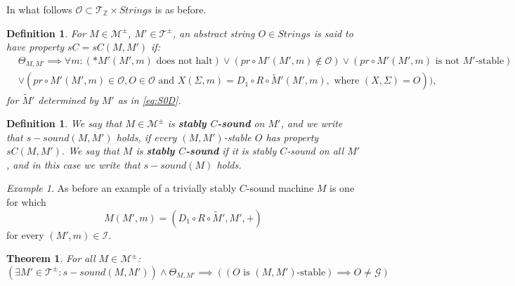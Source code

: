 \documentclass{amsart}  %
\numberwithin{equation}{section}
\newtheorem{theorem}[equation]{Theorem}
\newtheorem{definition}[equation]{Definition}
\theoremstyle{definition}
\theoremstyle{remark}
\newtheorem{example}{Example}
\begin{document}
{In what follows $\mathcal{O} \subset \mathcal{T} _{\mathbb{Z}} \times Strings $ is as before.
\begin{definition} \label{def:SpropertyO} 
For ${M} \in \mathcal{M} ^{\pm} $, ${M}' \in \mathcal{T} ^{\pm}  $,  an abstract string $O \in Strings$  is said to have property \textbf{\emph{ $sC=sC ({M}, {M}')$}} if:
\begin{align*}
   & \Theta _{M,M'} \implies \forall m: (*M'(M',m) \text{ does not halt} )  \lor (pr \circ M' (M',m) \notin \mathcal{O}) \lor (pr \circ M' (M',m) \text{ is not $M'$-stable}) \\  & \lor (pr \circ M' (M',m) \in \mathcal{O}, O \in \mathcal{O} \text{ and } X(\Sigma,m) = D_1 \circ R \circ  \widetilde{M}' (M', m), \text{ where $(X, \Sigma)=O$})),
\end{align*}
for $\widetilde{M}'  $ determined by $M'$ as in \eqref{eq:S0D}. 
\end {definition}
\begin{definition} \label{def:SPsound}
   We say that ${M} \in \mathcal{M} ^{\pm}  $ is \textbf{\emph{stably $C$-sound}} on ${M}'$, and we write that $s-sound ({M}, {M}')$ holds, if every  $(M,M')$-stable $O$ has property $sC ({M}, {M}')$. We say that ${M}$ is \textbf{\emph{stably $C$-sound}} if it is stably $C$-sound on all ${M}'$, and in this case we write that $s-sound ({M})$ holds.
 \end{definition}
\begin{example} \label{example:strivial}
  As before an example of a trivially stably $C$-sound machine $M$ is one for which $$M (M',m) =  (D_1 \circ R \circ  \widetilde{M}', M',+) $$ for every $(M',m) \in \mathcal{I} $. 
\end {example}
\begin{theorem} \label{thm:stablediagonalization} For all $M \in \mathcal{M} ^{\pm} $:
\begin{equation*}
   (\exists M' \in \mathcal{T} ^{\pm}: s-sound ({M}, {M}')) \land \Theta _{{M}, {M}'} \implies ((\text{$O$ is $(M,M')$-stable}) \implies O \neq \mathcal{G})

\end{equation*}
\end{theorem}}
\end{document}
